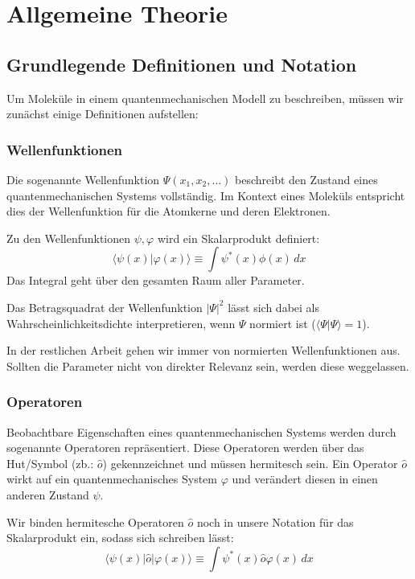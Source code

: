 \section{Allgemeine Theorie}

\subsection{Grundlegende Definitionen und Notation}
Um Moleküle in einem quantenmechanischen Modell zu beschreiben,
müssen wir zunächst einige Definitionen aufstellen:

\subsubsection{Wellenfunktionen}
Die sogenannte Wellenfunktion $\Psi(x_1, x_2, \dots)$ 
beschreibt den Zustand eines quantenmechanischen Systems vollständig.
Im Kontext eines Moleküls entspricht dies der Wellenfunktion für die Atomkerne
und deren Elektronen.

Zu den Wellenfunktionen $\psi, \varphi$ wird ein Skalarprodukt definiert:
\begin{equation}
    \langle \psi(x) \vert \varphi(x) \rangle \equiv  \int \psi^*(x) \phi(x) \,dx
\end{equation}
Das Integral geht über den gesamten Raum aller Parameter.

Das Betragsquadrat der Wellenfunktion $\vert \Psi \vert^2$
lässt sich dabei als Wahrscheinlichkeitsdichte interpretieren, wenn $\Psi$ normiert ist
($\langle \Psi \vert \Psi \rangle = 1$).

\cite[S. 20-21, 24]{atkins_friedman_2011}

In der restlichen Arbeit gehen wir immer von normierten Wellenfunktionen aus.
Sollten die Parameter nicht von direkter Relevanz sein, werden diese weggelassen.

\subsubsection{Operatoren}
Beobachtbare Eigenschaften eines quantenmechanischen Systems 
werden durch sogenannte Operatoren repräsentiert.
Diese Operatoren werden über das Hut\-/Symbol (zb.: $\hat{o}$) gekennzeichnet
und müssen hermitesch sein.
Ein Operator $\hat{o}$ wirkt auf ein quantenmechanisches System $\varphi$
und verändert diesen in einen anderen Zustand $\psi$.

Wir binden hermitesche Operatoren $\hat{o}$ noch in unsere Notation für das Skalarprodukt ein,
sodass sich schreiben lässt:
\begin{equation}
    \langle \psi(x) \vert \hat{o} \vert \varphi(x) \rangle \equiv
    \int \psi^*(x) \hat{o} \varphi(x) \,dx
\end{equation}

